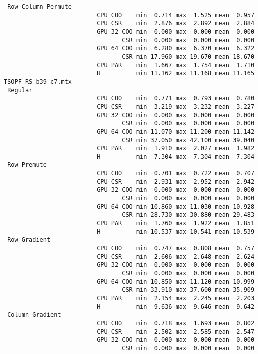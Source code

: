 \begin{verbatim}
 Row-Column-Permute
                          CPU COO    min  0.714 max  1.525 mean  0.957
                          CPU CSR    min  2.876 max  2.892 mean  2.884
                          GPU 32 COO min  0.000 max  0.000 mean  0.000
                                 CSR min  0.000 max  0.000 mean  0.000
                          GPU 64 COO min  6.280 max  6.370 mean  6.322
                                 CSR min 17.960 max 19.670 mean 18.670
                          CPU PAR    min  1.667 max  1.754 mean  1.710
                          H          min 11.162 max 11.168 mean 11.165
TSOPF_RS_b39_c7.mtx
 Regular
                          CPU COO    min  0.771 max  0.793 mean  0.780
                          CPU CSR    min  3.219 max  3.232 mean  3.227
                          GPU 32 COO min  0.000 max  0.000 mean  0.000
                                 CSR min  0.000 max  0.000 mean  0.000
                          GPU 64 COO min 11.070 max 11.200 mean 11.142
                                 CSR min 37.050 max 42.100 mean 39.040
                          CPU PAR    min  1.910 max  2.027 mean  1.982
                          H          min  7.304 max  7.304 mean  7.304
 Row-Premute
                          CPU COO    min  0.701 max  0.722 mean  0.707
                          CPU CSR    min  2.931 max  2.952 mean  2.942
                          GPU 32 COO min  0.000 max  0.000 mean  0.000
                                 CSR min  0.000 max  0.000 mean  0.000
                          GPU 64 COO min 10.860 max 11.030 mean 10.928
                                 CSR min 28.730 max 30.880 mean 29.483
                          CPU PAR    min  1.760 max  1.922 mean  1.851
                          H          min 10.537 max 10.541 mean 10.539
 Row-Gradient
                          CPU COO    min  0.747 max  0.808 mean  0.757
                          CPU CSR    min  2.606 max  2.648 mean  2.624
                          GPU 32 COO min  0.000 max  0.000 mean  0.000
                                 CSR min  0.000 max  0.000 mean  0.000
                          GPU 64 COO min 10.850 max 11.120 mean 10.999
                                 CSR min 33.910 max 37.600 mean 35.909
                          CPU PAR    min  2.154 max  2.245 mean  2.203
                          H          min  9.636 max  9.646 mean  9.642
 Column-Gradient
                          CPU COO    min  0.718 max  1.693 mean  0.802
                          CPU CSR    min  2.502 max  2.585 mean  2.547
                          GPU 32 COO min  0.000 max  0.000 mean  0.000
                                 CSR min  0.000 max  0.000 mean  0.000

\end{verbatim}
